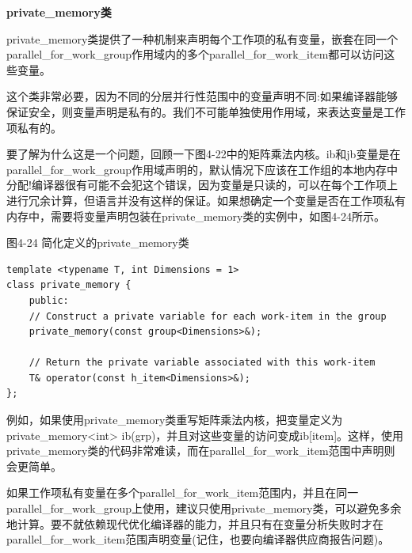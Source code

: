 \hspace*{\fill} \par %
\textbf{private\_memory类}

private\_memory类提供了一种机制来声明每个工作项的私有变量，嵌套在同一个parallel\_for\_work\_group作用域内的多个parallel\_for\_work\_item都可以访问这些变量。\par

这个类非常必要，因为不同的分层并行性范围中的变量声明不同:如果编译器能够保证安全，则变量声明是私有的。我们不可能单独使用作用域，来表达变量是工作项私有的。\par

要了解为什么这是一个问题，回顾一下图4-22中的矩阵乘法内核。ib和jb变量是在parallel\_for\_work\_group作用域声明的，默认情况下应该在工作组的本地内存中分配!编译器很有可能不会犯这个错误，因为变量是只读的，可以在每个工作项上进行冗余计算，但语言并没有这样的保证。如果想确定一个变量是否在工作项私有内存中，需要将变量声明包装在private\_memory类的实例中，如图4-24所示。\par

\hspace*{\fill} \par %
图4-24 简化定义的private\_memory类
\begin{lstlisting}[caption={}]
template <typename T, int Dimensions = 1>
class private_memory {
	public:
	// Construct a private variable for each work-item in the group
	private_memory(const group<Dimensions>&);
	
	// Return the private variable associated with this work-item
	T& operator(const h_item<Dimensions>&);
};
\end{lstlisting}

例如，如果使用private\_memory类重写矩阵乘法内核，把变量定义为private\_memory<int> ib(grp)，并且对这些变量的访问变成ib[item]。这样，使用private\_memory类的代码非常难读，而在parallel\_for\_work\_item范围中声明则会更简单。\par

如果工作项私有变量在多个parallel\_for\_work\_item范围内，并且在同一parallel\_for\_work\_group上使用，建议只使用private\_memory类，可以避免多余地计算。要不就依赖现代优化编译器的能力，并且只有在变量分析失败时才在parallel\_for\_work\_item范围声明变量(记住，也要向编译器供应商报告问题)。\par


















